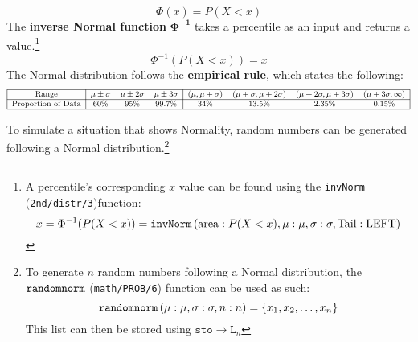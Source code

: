 \documentclass[../AP_Statistics.tex]{subfiles}
\begin{document}
			\[\Phi(x) = P(X < x)\]
			The \textbf{inverse Normal function} $\pmb{\Phi^{-1}}$ takes a percentile as an input and returns a value.\footnote{A percentile's corresponding $x$ value can be found using the \texttt{invNorm} (\texttt{2nd/distr/3})function:\[x = \Phi^{-1}(P(X < x)) = \operatorname{\texttt{invNorm}}\left(\mathrm{area}:P(X < x), \mu: \mu, \sigma: \sigma, \mathrm{Tail: LEFT}\right)\]}
			\[\Phi^{-1}(P(X < x)) = x\]
			The Normal distribution follows the \textbf{empirical rule}, which states the following:
			\[\footnotesize\begin{array}{|c|ccc|cccc|}\hline
				\rm{Range} & \mu \pm \sigma & \mu \pm 2\sigma & \mu \pm 3\sigma & (\mu, \mu + \sigma) & (\mu + \sigma, \mu + 2\sigma) & (\mu + 2\sigma, \mu + 3\sigma) & (\mu + 3\sigma, \infty)\\\hline
				\text{Proportion\index{proportion} of Data} & 60\% & 95\% & 99.7\% & 34\% & 13.5\% & 2.35\% & 0.15\% \\\hline
			\end{array}\]
			\begin{center}
			\end{center}
			To simulate a situation that shows Normality, random numbers can be generated following a Normal distribution.\footnote{To generate $n$ random numbers following a Normal distribution, the $\operatorname{\texttt{randomnorm}}$ (\texttt{math/PROB/6}) function can be used as such:\[\operatorname{\texttt{randomnorm}}\left(\mu: \mu, \sigma: \sigma, n: n\right) = \{x_1, x_2 , \ldots, x_n\}\]This list can then be stored using $\texttt{sto}\to\texttt{L}_n$}
\end{document}
